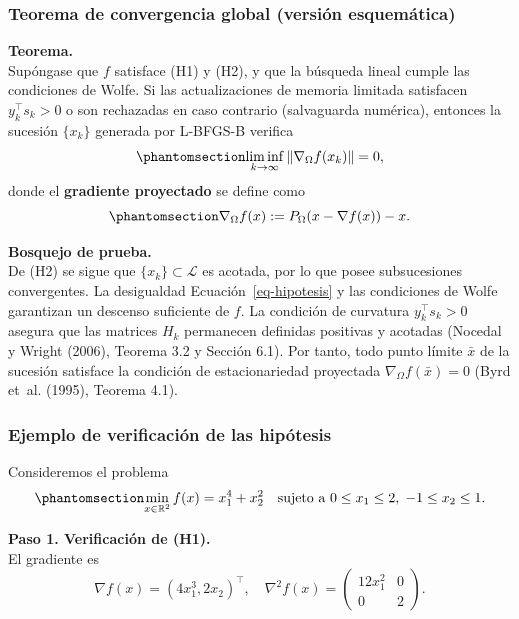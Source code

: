 \documentclass[
  spanish,
  us-letterpaper,
]{scrreprt}
\numberwithin{equation}{section}
\begin{document}
\subsubsection{Teorema de convergencia global (versión
esquemática)}\label{teorema-de-convergencia-global-versiuxf3n-esquemuxe1tica}

\textbf{Teorema.}\\
Supóngase que \(f\) satisface (H1) y (H2), y que la búsqueda lineal
cumple las condiciones de Wolfe. Si las actualizaciones de memoria
limitada satisfacen \(y_k^\top s_k > 0\) o son rechazadas en caso
contrario (salvaguarda numérica), entonces la sucesión \(\{x_k\}\)
generada por L-BFGS-B verifica
\begin{equation}\phantomsection\label{eq-40}{
\liminf_{k \to \infty} \|\nabla_\Omega f(x_k)\| = 0, 
}\end{equation} donde el \textbf{gradiente proyectado} se define como
\begin{equation}\phantomsection\label{eq-41}{
\nabla_\Omega f(x) := P_\Omega(x - \nabla f(x)) - x. 
}\end{equation}

\textbf{Bosquejo de prueba.}\\
De (H2) se sigue que \(\{x_k\} \subset \mathcal{L}\) es acotada, por lo
que posee subsucesiones convergentes. La desigualdad
Ecuación~\ref{eq-hipotesis} y las condiciones de Wolfe garantizan un
descenso suficiente de \(f\). La condición de curvatura
\(y_k^\top s_k > 0\) asegura que las matrices \(H_k\) permanecen
definidas positivas y acotadas (Nocedal y Wright (2006), Teorema 3.2 y
Sección 6.1). Por tanto, todo punto límite \(\bar{x}\) de la sucesión
satisface la condición de estacionariedad proyectada
\(\nabla_\Omega f(\bar{x}) = 0\) (Byrd et~al. (1995), Teorema 4.1).

\subsubsection{Ejemplo de verificación de las
hipótesis}\label{ejemplo-de-verificaciuxf3n-de-las-hipuxf3tesis}

Consideremos el problema \begin{equation}\phantomsection\label{eq-42}{
\min_{x \in \mathbb{R}^2} f(x) = x_1^4 + x_2^2
\quad \text{sujeto a } 0 \le x_1 \le 2,\; -1 \le x_2 \le 1.
}\end{equation}

\textbf{Paso 1. Verificación de (H1).}\\
El gradiente es \[
\nabla f(x) = (4x_1^3, 2x_2)^\top, \quad
\nabla^2 f(x) = \begin{pmatrix} 12x_1^2 & 0 \\ 0 & 2 \end{pmatrix}.
\]
\end{document}
